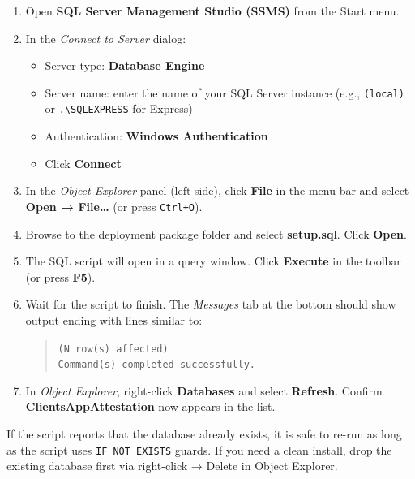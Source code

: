 \documentclass[12pt,a4paper]{report}
\begin{document}
\begin{enumerate}
  \item Open \textbf{SQL Server Management Studio (SSMS)} from the Start menu.

  \item In the \emph{Connect to Server} dialog:
  \begin{itemize}
    \item Server type: \textbf{Database Engine}
    \item Server name: enter the name of your SQL Server instance (e.g., \texttt{(local)} or \texttt{.\textbackslash SQLEXPRESS} for Express)
    \item Authentication: \textbf{Windows Authentication}
    \item Click \textbf{Connect}
  \end{itemize}

  \item In the \emph{Object Explorer} panel (left side), click \textbf{File} in the menu bar and select \textbf{Open → File\ldots} (or press \texttt{Ctrl+O}).

  \item Browse to the deployment package folder and select \textbf{setup.sql}. Click \textbf{Open}.

  \item The SQL script will open in a query window. Click \textbf{Execute} in the toolbar (or press \textbf{F5}).

  \item Wait for the script to finish. The \emph{Messages} tab at the bottom should show output ending with lines similar to:
  \begin{quote}
    \texttt{(N row(s) affected)}\\
    \texttt{Command(s) completed successfully.}
  \end{quote}

  \item In \emph{Object Explorer}, right-click \textbf{Databases} and select \textbf{Refresh}. Confirm \textbf{ClientsAppAttestation} now appears in the list.
\end{enumerate}

\begin{notebox}
If the script reports that the database already exists, it is safe to re-run as long as the script uses \texttt{IF NOT EXISTS} guards. If you need a clean install, drop the existing database first via right-click → Delete in Object Explorer.
\end{notebox}
\end{document}
